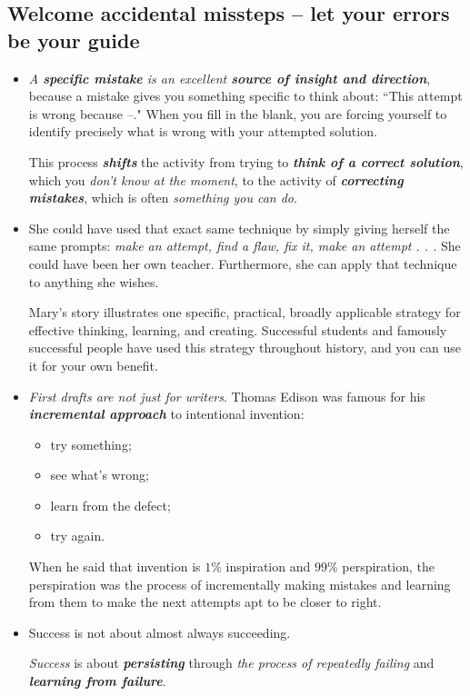 \documentclass[11pt]{article}
\begin{document}
\subsection{Welcome accidental missteps -- let your errors be your guide}
\begin{itemize}
\item \emph{A \textbf{specific mistake} is an excellent \textbf{source of insight and direction}}, because a mistake gives you something specific to think about: ``This attempt is wrong because --." When you fill in the blank, you are forcing yourself to identify precisely what is wrong with your
attempted solution. 

This process \emph{\textbf{shifts}} the activity from trying to \emph{\textbf{think of a correct solution}}, which you \emph{don’t know at the moment}, to the activity of \emph{\textbf{correcting mistakes}}, which is often \emph{something you can do}.

\item She could have used that exact same technique by simply giving herself the same prompts: \emph{make an attempt, find a flaw, fix it, make an attempt . . .} She could have been her own teacher. Furthermore, she can apply that technique to anything she wishes.

Mary’s story illustrates one specific, practical, broadly applicable strategy for effective thinking, learning, and creating. Successful students and famously successful people have used this strategy throughout history, and you can use it for your own benefit.

\item \emph{First drafts are not just for writers}. Thomas Edison was famous for his \emph{\textbf{incremental approach}} to intentional invention: 
\begin{itemize}
\item try something; 
\item see what’s wrong; 
\item learn from the defect;
\item  try again.
\end{itemize}
When he said that invention is $1\%$ inspiration and $99\%$ perspiration, the perspiration was the process of incrementally making mistakes and learning from them to make the next attempts apt to be closer to right. 

\item Success is not about almost always succeeding. 

\emph{Success} is about \emph{\textbf{persisting}} through \emph{the process of repeatedly failing} and \emph{\textbf{learning from failure}}.


\end{itemize}
\end{document}
